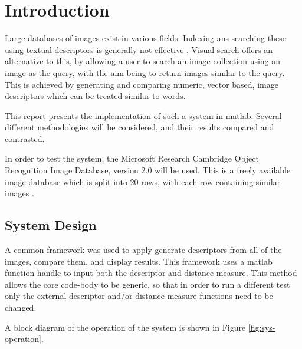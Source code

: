 \chapter{Introduction} \label{sec:intro}

Large databases of images exist in various fields. Indexing ans searching these using textual descriptors is generally not effective \cite[p.657]{forsyth2012}. Visual search offers an alternative to this, by allowing a user to search an image collection using an image as the query, with the aim being to return images similar to the query. This is achieved by generating and comparing numeric, vector based, image descriptors which can be treated similar to words.

This report presents the implementation of such a system in \gls{matlab}. Several different methodologies will be considered, and their results compared and contrasted.

In order to test the system, the Microsoft Research Cambridge Object Recognition Image Database, version 2.0 will be used. This is a freely available image database which is split into 20 rows, with each row containing similar images \cite{criminisi2004}.

\section{System Design} \label{sec:sys-design}
A common framework was used to apply generate descriptors from all of the images, compare them, and display results. This framework uses a \gls{matlab} function handle to input both the descriptor and distance measure. This method allows the core code-body to be generic, so that in order to run a different test only the external descriptor and/or distance measure functions need to be changed.

A block diagram of the operation of the system is shown in Figure \ref{fig:sys-operation}.

